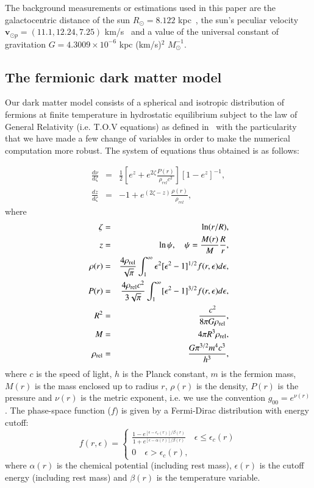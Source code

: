 \documentclass[twocolumn]{aa}
\begin{document}
The background measurements or estimations used in this paper are the
galactocentric distance of the sun $R_\odot=8.122$ kpc~\citep{2018A&A...615L..15G}, the sun's peculiar
velocity $\boldsymbol{v}_{\odot p} = (11.1, 12.24, 7.25)$ km/s~\citep{Shonrich} and a value of the universal constant
of gravitation $G= 4.3009\times10^{-6}$ kpc (km/s)$^2$ $M_\odot^{-1}$.


\subsection{The fermionic dark matter model}
Our dark matter model consists of a spherical and isotropic distribution of fermions at finite temperature in hydrostatic equilibrium subject to the law of General Relativity (i.e. T.O.V equations) as defined in~\cite{arguelles_novel_2018} with the particularity that we have made a few change of variables in order to make the numerical computation more robust. The system of equations thus obtained is as follows:

\begin{eqnarray}
   \label{sode}
   \frac{d\nu}{d\zeta} & = & \frac{1}{2}\left[e^{z}+e^{2\zeta}\frac{P(r)}{\rho_{rel}c^2}\right][1-e^{z}]^{-1},\\
   \frac{dz}{d\zeta} & = &-1+e^{(2\zeta-z)}\frac{\rho(r)}{\rho_{rel}},
\end{eqnarray}
where
\begin{eqnarray}
   \zeta &=& \ln(r/R),\\
   z &=&\ln\psi,\quad \psi = \frac{M(r)}{M}\frac{R}{r},\label{mass_dm}\\
   \rho(r)&=&\frac{4\rho_{\rm rel}}{\sqrt{\pi}}\int^\infty_1\epsilon^2[\epsilon^2-1]^{1/2}f(r,\epsilon)d\epsilon,\\
   P(r)&=&\frac{4\rho_{\rm rel}c^2}{3\sqrt{\pi}}\int^\infty_1[\epsilon^2-1]^{3/2}f(r,\epsilon)d\epsilon,\\
   R^2 &=& \frac{c^2}{8\pi G \rho_{\rm{rel}}},\\
   M &=& 4\pi R^3 \rho_{\rm{rel}},\\
   \rho_{\rm{rel}}&=& \frac{ G\pi^{3/2} m^4 c^3}{h^3},
\end{eqnarray}
where $c$ is the speed of light, $h$ is the Planck constant, $m$ is the fermion mass, $M(r)$ is the mass enclosed up to radius $r$, $\rho(r)$ is the density, $P(r)$ is the pressure and $\nu(r)$ is the metric exponent, i.e. we use the convention $g_{00}=e^{\nu(r)}$. The phase-space function ($f$) is given by a Fermi-Dirac distribution with energy cutoff:
\begin{equation}
f(r,\epsilon)=
   \begin{cases}
      \frac{1-e^{[\epsilon-\epsilon_c(r)]/\beta(r)}}
      {1+e^{[\epsilon-\alpha(r)]/\beta(r)}}\quad \epsilon \leq \epsilon_c(r)\\
      0\quad \epsilon > \epsilon_c(r),
   \end{cases}
\end{equation}
where $\alpha(r)$ is the chemical potential (including rest mass), $\epsilon(r)$ is the cutoff
energy (including rest mass) and $\beta(r)$ is the temperature variable.
\end{document}
